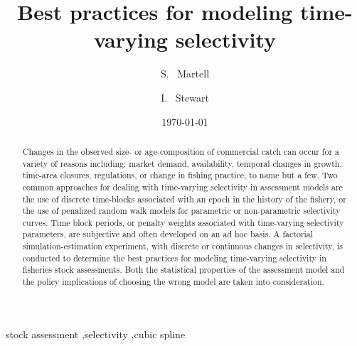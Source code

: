 \documentclass[review,letterpaper,10pt,authoryear]{elsarticle}
\title{Best practices for modeling time-varying selectivity}
\author[sm]{S. ~Martell\corref{cor1}}
\author[is]{I. ~Stewart}
\date{\today}
\begin{document}


	
	
	
	\begin{abstract}

    Changes in the observed size- or age-composition of commercial catch can occur for a variety of reasons including: market demand, availability, temporal changes in growth, time-area closures, regulations, or change in fishing practice, to name but a few.  Two common approaches for dealing with time-varying selectivity in assessment models are the use of discrete time-blocks associated with an epoch in the history of the fishery, or the use of penalized random walk models for parametric or non-parametric selectivity curves.  Time block periods, or penalty weights associated with time-varying selectivity parameters, are subjective and often developed on an ad hoc basis. A factorial simulation-estimation experiment, with discrete or continuous changes in selectivity, is conducted to determine the best practices for modeling time-varying selectivity in fisheries stock assessments. Both the statistical properties of the assessment model and the policy implications of choosing the wrong model are taken into consideration.

	\end{abstract}
	\begin{keyword}
		stock assessment \sep selectivity \sep cubic spline		
	\end{keyword}


	\maketitle
	
	
	
	
	


	
	
	
\end{document}
